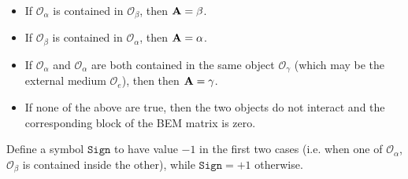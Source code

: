 \documentclass[dvips,letterpaper]{article}
\begin{document}
\begin{itemize}
 \item If $\mathcal{O}_\alpha$ is contained in $\mathcal{O}_\beta$, 
       then $\mathbf{A}=\beta$.
 \item If $\mathcal{O}_\beta$ is contained in $\mathcal{O}_\alpha$, 
       then $\mathbf{A}=\alpha$.
 \item If $\mathcal{O}_\alpha$ and $\mathcal{O}_\alpha$ are both
       contained in the same object $\mathcal{O}_\gamma$ (which may
       be the external medium $\mathcal{O}_e$), then  
       then $\mathbf{A}=\gamma$.
 \item If none of the above are true, then the two objects do not
       interact and the corresponding block of the BEM matrix is
       zero.
\end{itemize}

Define a symbol $\texttt{Sign}$ to have value $-1$ in the first
two cases (i.e. when one of $\mathcal{O}_\alpha$, $\mathcal{O}_\beta$
is contained inside the other), while $\texttt{Sign}=+1$ otherwise.
\end{document}
